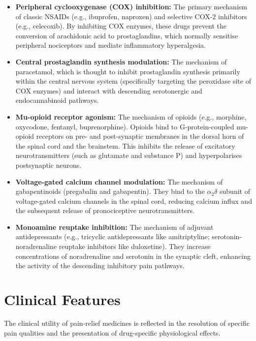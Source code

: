 \begin{itemize}
    \item \textbf{Peripheral cyclooxygenase (COX) inhibition:} The primary mechanism of classic NSAIDs (e.g., ibuprofen, naproxen) and selective COX-2 inhibitors (e.g., celecoxib). By inhibiting COX enzymes, these drugs prevent the conversion of arachidonic acid to prostaglandins, which normally sensitise peripheral nociceptors and mediate inflammatory hyperalgesia.
    \item \textbf{Central prostaglandin synthesis modulation:} The mechanism of paracetamol, which is thought to inhibit prostaglandin synthesis primarily within the central nervous system (specifically targeting the peroxidase site of COX enzymes) and interact with descending serotonergic and endocannabinoid pathways.
    \item \textbf{Mu-opioid receptor agonism:} The mechanism of opioids (e.g., morphine, oxycodone, fentanyl, buprenorphine). Opioids bind to G-protein-coupled mu-opioid receptors on pre- and post-synaptic membranes in the dorsal horn of the spinal cord and the brainstem. This inhibits the release of excitatory neurotransmitters (such as glutamate and substance P) and hyperpolarises postsynaptic neurons.
    \item \textbf{Voltage-gated calcium channel modulation:} The mechanism of gabapentinoids (pregabalin and gabapentin). They bind to the $\alpha_2\delta$ subunit of voltage-gated calcium channels in the spinal cord, reducing calcium influx and the subsequent release of pronociceptive neurotransmitters.
    \item \textbf{Monoamine reuptake inhibition:} The mechanism of adjuvant antidepressants (e.g., tricyclic antidepressants like amitriptyline; serotonin-noradrenaline reuptake inhibitors like duloxetine). They increase concentrations of noradrenaline and serotonin in the synaptic cleft, enhancing the activity of the descending inhibitory pain pathways.
\end{itemize}

\section*{Clinical Features}
The clinical utility of pain-relief medicines is reflected in the resolution of specific pain qualities and the presentation of drug-specific physiological effects.

